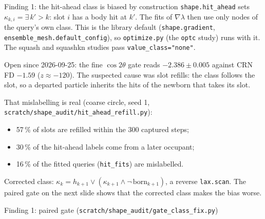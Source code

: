 \documentclass[10pt,aspectratio=169]{beamer}
\newcommand{\code}[1]{\texttt{\small #1}}
\begin{document}
\begin{frame}{Finding 1: the hit-ahead class is biased by construction}
\code{shape.hit\_ahead} sets $\kappa_{k,i} = \exists\,k'>k$: slot $i$ has a body hit at $k'$.  The
fits of $\nabla\lambda$ then use only nodes of the query's own class.  This is the library
default (\code{shape.gradient}, \code{ensemble\_mesh.default\_config}), so \code{optimize.py}
(the \code{optc} study) runs with it.  The squash and squashkn studies pass
\code{value\_class="none"}.

\medskip
Open since 2026-09-25: the fine $\cos2\theta$ gate reads $-2.386\pm0.005$ against CRN FD $-1.59$
($z\approx-120$).  The suspected cause was slot refills: the class follows the slot, so a departed
particle inherits the hits of the newborn that takes its slot.

\medskip
That mislabelling is real (coarse circle, seed 1, \code{scratch/shape\_audit/hit\_ahead\_refill.py}):
\begin{itemize}
\item 57\,\% of slots are refilled within the 300 captured steps;
\item 30\,\% of the hit-ahead labels come from a later occupant;
\item 16\,\% of the fitted queries (\code{hit\_fits}) are mislabelled.
\end{itemize}
Corrected class: $\kappa_k = h_{k+1}\vee(\kappa_{k+1}\wedge\neg\,\mathrm{born}_{k+1})$, a reverse
\code{lax.scan}.  The paired gate on the next slide shows that the corrected class makes the
bias worse.
\end{frame}

\begin{frame}{Finding 1: paired gate (\code{scratch/shape\_audit/gate\_class\_fix.py})}

\end{frame}
\end{document}
